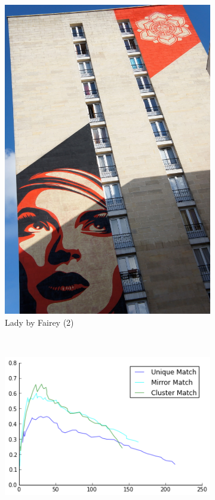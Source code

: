 \documentclass{article}
\begin{document}
\begin{figure}
{\begin{subfigure}[t]{0.25\textwidth}
			\includegraphics[width=\textwidth]{images/fairey_lady_2}
			\caption{Lady by Fairey (2)}
			\label{fig:lady2}
		\end{subfigure}%
		~ %
		\begin{subfigure}[t]{0.55\textwidth}
			\centering
			\includegraphics[width=\textwidth]{images/result_fairey_lady}

\end{subfigure}}
\end{figure}
\end{document}
